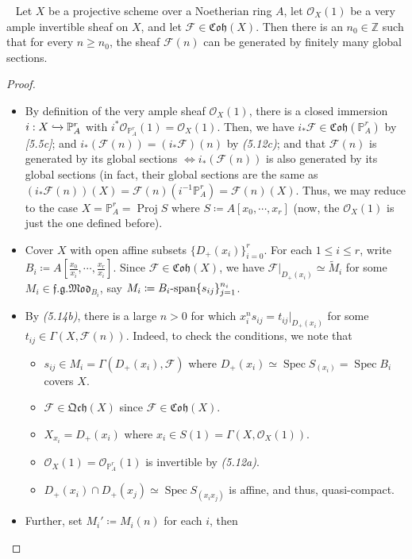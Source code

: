 \documentclass[11pt,a4paper,footinclude=true,headinclude=true]{scrbook} %
\DeclareMathOperator{\Spec}{Spec}
\DeclareMathOperator{\Proj}{Proj}
\newcommand{\FF}{\mathscr{F}}
\newcommand{\OO}{\mathcal{O}}
\newcommand{\PP}{\mathbb{P}}
\newcommand{\<}{\langle}
\newcommand{\>}{\rangle}
\newcommand{\spn}{\mathchar`-\mathrm{span}}
\newcommand{\fg}{\mathfrak{f.g.}}
\newcommand{\MOD}{\mathfrak{Mod}}
\newcommand{\qcoh}{\mathfrak{Qch}}
\newcommand{\coh}{\mathfrak{Coh}}
\newenvironment{theorem}[2][]
{\renewcommand\theinnercustomthm{#2}\innercustomthm[#1]
\begin{mdframed}[backgroundcolor=yellow!20]\ }
{\end{mdframed}\endinnercustomthm}
\begin{document}
\begin{theorem}{5.17. (Serre)}
    Let $X$ be a projective scheme over a Noetherian ring $A$, let $\OO_X(1)$ be a very ample invertible sheaf on $X$, and let $\FF\in\coh(X)$. Then there is an $n_0\in\mathbb{Z}$ such that for every $n\geq n_0$, the sheaf $\FF(n)$ can be generated by finitely many global sections.
\end{theorem}
\begin{proof}\mbox{}
    \begin{itemize}
        \item By definition of the very ample sheaf $\OO_X(1)$, there is a closed immersion $i:X\xhookrightarrow{}\PP_A^r$ with $i^\ast\OO_{\PP_A^r}(1)=\OO_X(1)$. Then, we have $i_\ast\FF\in\coh(\PP_A^r)$ by \textit{[5.5c]}; and $i_\ast(\FF(n))=(i_\ast\FF)(n)$ by \textit{(5.12c)}; and that $\FF(n)$ is generated by its global sections $\Longleftrightarrow i_\ast(\FF(n))$ is also generated by its global sections (in fact, their global sections are the same as $(i_\ast\FF(n))(X)=\FF(n)(i^{-1}\PP_A^r)=\FF(n)(X)$. Thus, we may reduce to the case $X=\PP_A^r=\Proj S$ where $S\coloneqq A[x_0,\cdots,x_r]$ (now, the $\OO_X(1)$ is just the one defined before).
        \item Cover $X$ with open affine subsets $\{D_+(x_i)\}_{i=0}^r$. For each $1\leq i\leq r$, write $B_i\coloneqq A[\frac{x_0}{x_i},\cdots,\frac{x_r}{x_i}]$. Since $\FF\in\coh(X)$, we have $\FF|_{D_+(x_i)}\simeq\widetilde{M}_i$ for some $M_i\in\fg\MOD_{B_i}$, say $M_i\coloneqq B_i\spn\{s_{ij}\}_{j=1}^{n_i}$.
        \item By \textit{(5.14b)}, there is a large $n>0$ for which $x_i^ns_{ij}=t_{ij}|_{D_+(x_i)}$ for some $t_{ij}\in\Gamma(X,\FF(n))$. Indeed, to check the conditions, we note that
        \begin{itemize}
            \item $s_{ij}\in M_i=\Gamma(D_+(x_i),\FF)$ where $D_+(x_i)\simeq\Spec S_{(x_i)}=\Spec B_i$ covers $X$.
            \item $\FF\in\qcoh(X)$ since $\FF\in\coh(X)$. 
            \item $X_{x_i}=D_+(x_i)$ where $x_i\in S(1)=\Gamma(X,\OO_X(1))$.
            \item $\OO_X(1)=\OO_{\PP_A^r}(1)$ is invertible by \textit{(5.12a)}.
            \item $D_+(x_i)\cap D_+(x_j)\simeq\Spec S_{(x_ix_j)}$ is affine, and thus, quasi-compact.
        \end{itemize}
        \item Further, set $M_i'\coloneqq M_i(n)$ for each $i$, then

\end{itemize}
\end{proof}
\end{document}
